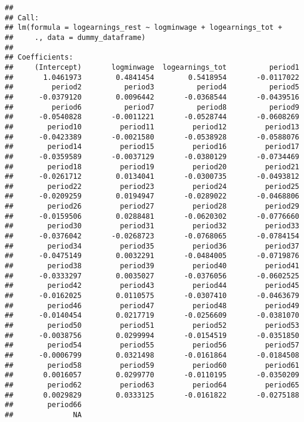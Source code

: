 \documentclass[
]{article}
\begin{document}
\begin{verbatim}
## 
## Call:
## lm(formula = logearnings_rest ~ logminwage + logearnings_tot + 
##     ., data = dummy_dataframe)
## 
## Coefficients:
##     (Intercept)       logminwage  logearnings_tot          period1  
##       1.0461973        0.4841454        0.5418954       -0.0117022  
##         period2          period3          period4          period5  
##      -0.0379120        0.0096442       -0.0368544       -0.0439516  
##         period6          period7          period8          period9  
##      -0.0540828       -0.0011221       -0.0528744       -0.0608269  
##        period10         period11         period12         period13  
##      -0.0423389       -0.0021580       -0.0538928       -0.0588076  
##        period14         period15         period16         period17  
##      -0.0359589       -0.0037129       -0.0380129       -0.0734469  
##        period18         period19         period20         period21  
##      -0.0261712        0.0134041       -0.0300735       -0.0493812  
##        period22         period23         period24         period25  
##      -0.0209259        0.0194947       -0.0289022       -0.0468806  
##        period26         period27         period28         period29  
##      -0.0159506        0.0288481       -0.0620302       -0.0776660  
##        period30         period31         period32         period33  
##      -0.0376042       -0.0268723       -0.0768065       -0.0784154  
##        period34         period35         period36         period37  
##      -0.0475149        0.0032291       -0.0484005       -0.0719876  
##        period38         period39         period40         period41  
##      -0.0333297        0.0035027       -0.0376056       -0.0602525  
##        period42         period43         period44         period45  
##      -0.0162025        0.0110575       -0.0307410       -0.0463679  
##        period46         period47         period48         period49  
##      -0.0140454        0.0217719       -0.0256609       -0.0381070  
##        period50         period51         period52         period53  
##      -0.0038756        0.0299994       -0.0154519       -0.0351850  
##        period54         period55         period56         period57  
##      -0.0006799        0.0321498       -0.0161864       -0.0184508  
##        period58         period59         period60         period61  
##       0.0016057        0.0299770       -0.0110195       -0.0350209  
##        period62         period63         period64         period65  
##       0.0029829        0.0333125       -0.0161822       -0.0275188  
##        period66  
##              NA
\end{verbatim}
\end{document}
